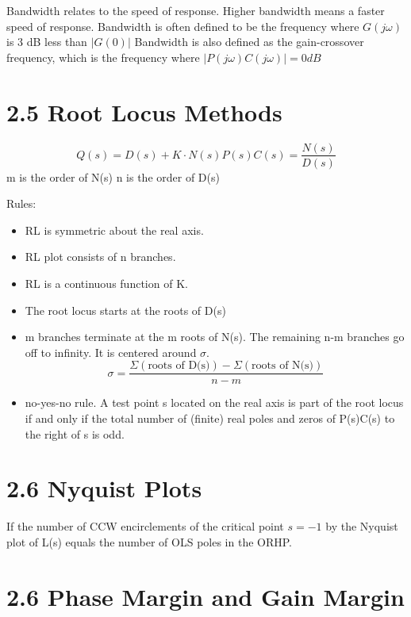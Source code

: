 Bandwidth relates to the speed of response.
Higher bandwidth means a faster speed of response.
Bandwidth is often defined to be the frequency where \( G(j\omega) \) is 3 dB less than \( | G(0) |\)
Bandwidth is also defined as the gain-crossover frequency, which is the frequency where \( |P(j\omega)C(j\omega)| = 0 dB \)

\section*{2.5 Root Locus Methods}

\begin{equation*}
    Q(s) = D(s) + K \cdot N(s)
    P(s)C(s) = \frac{N(s)}{D(s)}
\end{equation*}
m is the order of N(s)
n is the order of D(s)

Rules:
\begin{itemize}
    \item RL is symmetric about the real axis.
    \item RL plot consists of n branches.
    \item RL is a continuous function of K.
    \item The root locus starts at the roots of D(s)
    \item m branches terminate at the m roots of N(s). The remaining n-m branches go off to infinity. It is centered around \( \sigma \).
          \begin{equation*}
              \sigma = \frac{\Sigma(\text{roots of D(s)}) - \Sigma(\text{roots of N(s)})}{n-m}
          \end{equation*}
    \item no-yes-no rule. A test point s located on the real axis is part of the root locus if
          and only if the total number of (finite) real poles and zeros of P(s)C(s) to the right
          of s is odd.
\end{itemize}

\section*{2.6 Nyquist Plots}

If the number of CCW encirclements of the critical point \( s = -1 \) by the Nyquist plot of L(s) equals the number of OLS poles in the ORHP.

\section*{2.6 Phase Margin and Gain Margin}

